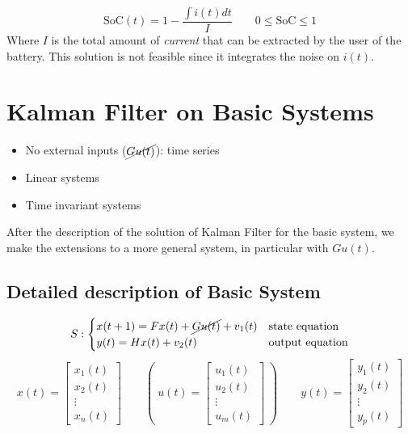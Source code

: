 \begin{example}
    \[
        \text{SoC}(t) = 1 - \frac{\int i(t)dt}{I} \qquad 0 \le \text{SoC} \le 1
    \]
    Where $I$ is the total amount of \emph{current} that can be extracted by the user of the battery.
    This solution is not feasible since it integrates the noise on $i(t)$.
\end{example}

\section{Kalman Filter on Basic Systems}

\begin{itemize}
    \item No external inputs ($\cancel{Gu(t)}$): time series
    \item Linear systems
    \item Time invariant systems
\end{itemize}

After the description of the solution of Kalman Filter for the basic system, we make the extensions to a more general system, in particular with $Gu(t)$.

\subsection{Detailed description of Basic System}

\[
    S: \begin{cases}
        x(t+1) = Fx(t) + \cancel{Gu(t)} + v_1(t) & \text{state equation}\\
        y(t) = Hx(t) + v_2(t) & \text{output equation}
    \end{cases}
\]
\[
    x(t) = \begin{bmatrix}
        x_1(t) \\
        x_2(t) \\
        \vdots \\
        x_n(t)
    \end{bmatrix}
    \qquad
    \left(\;u(t) = \begin{bmatrix}
        u_1(t) \\
        u_2(t) \\
        \vdots \\
        u_m(t)
    \end{bmatrix}\;\right)
    \qquad
    y(t) = \begin{bmatrix}
        y_1(t) \\
        y_2(t) \\
        \vdots \\
        y_p(t)
    \end{bmatrix}
\]

